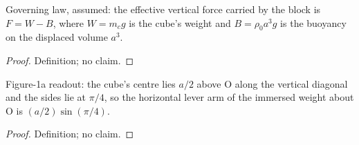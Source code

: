 \begin{definition}
\label{def:IPhO2026Problems_problem_IPhO_2026_1_A_1:IsNetImmersedWeight}
Governing law, assumed: the effective vertical force carried by the block is
$F = W - B$, where $W = m_c g$ is the cube's weight and
$B = \rho_0 a^3 g$ is the buoyancy on the displaced volume $a^3$.
\end{definition}
\begin{proof}
Definition; no claim.
\end{proof}

\begin{definition}
\label{def:IPhO2026Problems_problem_IPhO_2026_1_A_1:weightHorizontalLeverArm}
Figure-1a readout: the cube's centre lies $a/2$ above O along the vertical
diagonal and the sides lie at $\pi/4$, so the horizontal lever arm of the
immersed weight about O is $(a/2)\sin(\pi/4)$.
\end{definition}
\begin{proof}
Definition; no claim.
\end{proof}

